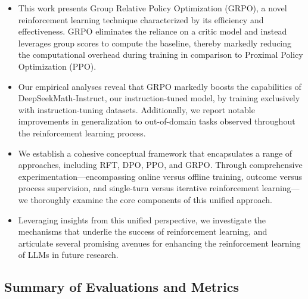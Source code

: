 \begin{itemize}[topsep=0pt]
    \item This work presents Group Relative Policy Optimization (GRPO), a novel reinforcement learning technique characterized by its efficiency and effectiveness. GRPO eliminates the reliance on a critic model and instead leverages group scores to compute the baseline, thereby markedly reducing the computational overhead during training in comparison to Proximal Policy Optimization (PPO).
    \item Our empirical analyses reveal that GRPO markedly boosts the capabilities of DeepSeekMath-Instruct, our instruction-tuned model, by training exclusively with instruction-tuning datasets. Additionally, we report notable improvements in generalization to out-of-domain tasks observed throughout the reinforcement learning process.
    \item We establish a cohesive conceptual framework that encapsulates a range of approaches, including RFT, DPO, PPO, and GRPO. Through comprehensive experimentation—encompassing online versus offline training, outcome versus process supervision, and single-turn versus iterative reinforcement learning—we thoroughly examine the core components of this unified approach.
    \item Leveraging insights from this unified perspective, we investigate the mechanisms that underlie the success of reinforcement learning, and articulate several promising avenues for enhancing the reinforcement learning of LLMs in future research.
\end{itemize}

\subsection{Summary of Evaluations and Metrics}


